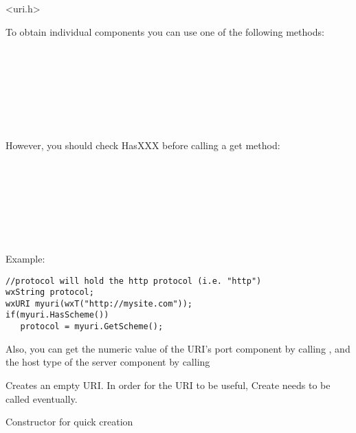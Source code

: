 <uri.h>



To obtain individual components you can use 
one of the following methods:

\\
\\
\\
\\
\\
\\

However, you should check HasXXX before
calling a get method:
 
\\
\\
\\
\\
\\
\\

Example:
\begin{verbatim}
//protocol will hold the http protocol (i.e. "http")
wxString protocol;
wxURI myuri(wxT("http://mysite.com"));
if(myuri.HasScheme())
   protocol = myuri.GetScheme();
\end{verbatim}

Also, you can get the numeric value of the URI's port
component by calling ,
and the host type of the server component by calling 

\label{wxuriwxuri}


Creates an empty URI.  In order for the URI to be
useful, Create needs to be called eventually.

\label{wxuridtor}


Constructor for quick creation

